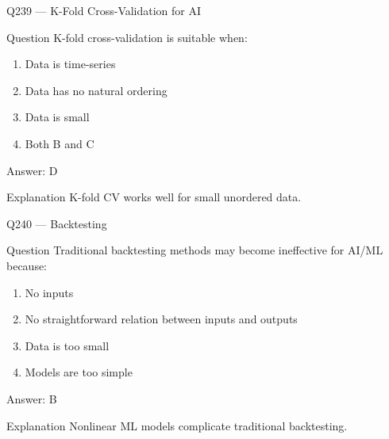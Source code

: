 \documentclass[aspectratio=169,8pt]{beamer}
\begin{document}
								\begin{frame}{Q239 --- K-Fold Cross-Validation for AI}
									\begin{block}{Question}
										K-fold cross-validation is suitable when:
										\begin{enumerate}
											\item Data is time-series
											\item Data has no natural ordering
											\item Data is small
											\item Both B and C
										\end{enumerate}
									\end{block}
									\begin{exampleblock}{Answer: D}\end{exampleblock}
									\begin{block}{Explanation}
										K-fold CV works well for small unordered data.
									\end{block}
								\end{frame}
								
								\begin{frame}{Q240 --- Backtesting}
									\begin{block}{Question}
										Traditional backtesting methods may become ineffective for AI/ML because:
										\begin{enumerate}
											\item No inputs
											\item No straightforward relation between inputs and outputs
											\item Data is too small
											\item Models are too simple
										\end{enumerate}
									\end{block}
									\begin{exampleblock}{Answer: B}\end{exampleblock}
									\begin{block}{Explanation}
										Nonlinear ML models complicate traditional backtesting.
									\end{block}
								\end{frame}
								
\end{document}
